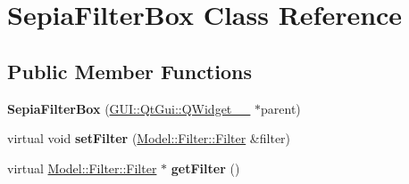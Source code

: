 \hypertarget{classGUI_1_1SepiaFilterBox}{}\section{Sepia\+Filter\+Box Class Reference}
\label{classGUI_1_1SepiaFilterBox}
\subsection*{Public Member Functions}
\begin{DoxyCompactItemize}
\item 
\hypertarget{classGUI_1_1SepiaFilterBox_a526dfc594e8f76e91615619e016d0180}{}{\bfseries Sepia\+Filter\+Box} (\hyperlink{classGUI_1_1QtGui_1_1QWidget____10}{G\+U\+I\+::\+Qt\+Gui\+::\+Q\+Widget\+\_\+\+\_} $\ast$parent)\label{classGUI_1_1SepiaFilterBox_a526dfc594e8f76e91615619e016d0180}

\item 
\hypertarget{classGUI_1_1SepiaFilterBox_ad7c0ee00fe3faac7942d75eec2a5342b}{}virtual void {\bfseries set\+Filter} (\hyperlink{classModel_1_1Filter_1_1Filter}{Model\+::\+Filter\+::\+Filter} \&filter)\label{classGUI_1_1SepiaFilterBox_ad7c0ee00fe3faac7942d75eec2a5342b}

\item 
\hypertarget{classGUI_1_1SepiaFilterBox_acef2029a93f4ab3a538cdb643b9c2613}{}virtual \hyperlink{classModel_1_1Filter_1_1Filter}{Model\+::\+Filter\+::\+Filter} $\ast$ {\bfseries get\+Filter} ()\label{classGUI_1_1SepiaFilterBox_acef2029a93f4ab3a538cdb643b9c2613}

\end{DoxyCompactItemize}
